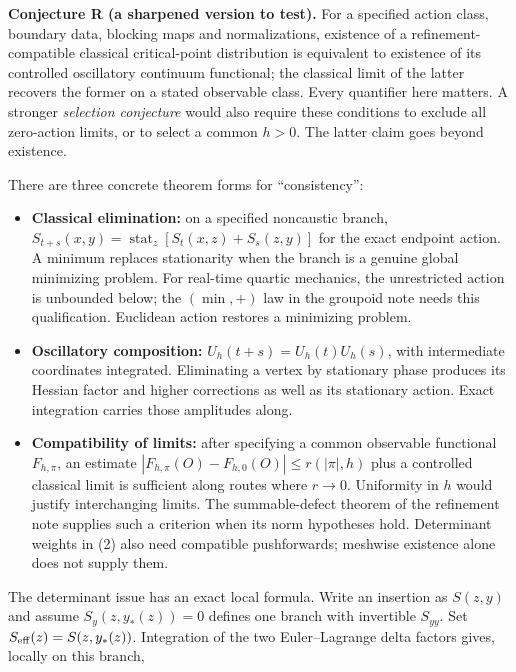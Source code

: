\documentclass[11pt,a4paper]{article}
\newcommand{\tightlist}{\setlength{\itemsep}{0pt}\setlength{\parskip}{0pt}}
\begin{document}
\textbf{Conjecture R (a sharpened version to test).} For a specified
action class, boundary data, blocking maps and normalizations, existence
of a refinement-compatible classical critical-point distribution is
equivalent to existence of its controlled oscillatory continuum
functional; the classical limit of the latter recovers the former on a
stated observable class. Every quantifier here matters. A stronger
\emph{selection conjecture} would also require these conditions to
exclude all zero-action limits, or to select a common \(h>0\). The
latter claim goes beyond existence.

There are three concrete theorem forms for ``consistency'':

\begin{itemize}
\tightlist
\item
  \textbf{Classical elimination:} on a specified noncaustic branch,
  \(S_{t+s}(x,y)=\operatorname{stat}_z[S_t(x,z)+S_s(z,y)]\) for the
  exact endpoint action. A minimum replaces stationarity when the branch
  is a genuine global minimizing problem. For real-time quartic
  mechanics, the unrestricted action is unbounded below; the
  \((\min,+)\) law in the groupoid note needs this qualification.
  Euclidean action restores a minimizing problem.
\item
  \textbf{Oscillatory composition:} \(U_h(t+s)=U_h(t)U_h(s)\), with
  intermediate coordinates integrated. Eliminating a vertex by
  stationary phase produces its Hessian factor and higher corrections as
  well as its stationary action. Exact integration carries those
  amplitudes along.
\item
  \textbf{Compatibility of limits:} after specifying a common observable
  functional \(F_{h,\pi}\), an estimate
  \(|F_{h,\pi}(O)-F_{h,0}(O)|\le r(|\pi|,h)\) plus a controlled
  classical limit is sufficient along routes where \(r\to0\). Uniformity
  in \(h\) would justify interchanging limits. The summable-defect
  theorem of the refinement note supplies such a criterion when its norm
  hypotheses hold. Determinant weights in (2) also need compatible
  pushforwards; meshwise existence alone does not supply them.
\end{itemize}

The determinant issue has an exact local formula. Write an insertion as
\(S(z,y)\) and assume \(S_y(z,y_*(z))=0\) defines one branch with
invertible \(S_{yy}\). Set \(S_{\rm eff}(z)=S(z,y_*(z))\). Integration
of the two Euler--Lagrange delta factors gives, locally on this branch,
\end{document}

